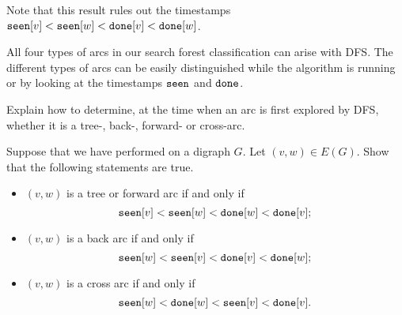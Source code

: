 Note that this result rules out  the timestamps $\seen[v] < \seen[w] < \done[v] < \done[w]$.



All four types of arcs in our search forest classification can
arise with DFS. The different types of arcs can be easily
distinguished while the algorithm is running or by looking at the timestamps 
$\seen$ and $\done$.

\begin{Boxample}[3]
Explain how to determine, at the time when an arc is first explored by
DFS, whether it is a tree-, back-, forward- or cross-arc.
\end{Boxample}

\begin{Boxample}[3]
Suppose that we have performed  on a digraph $G$. Let $(v, w)\in
E(G)$. Show that the following statements are true.
\begin{itemize}
\item
$(v, w)$ is a tree or forward arc if and only if  
$$\seen[v] < \seen[w] < \done[w] < \done[v];$$
\item
$(v, w)$ is a back arc if and only if
$$\seen[w] <  \seen[v] < \done[v] < \done[w];$$ 
\item
$(v, w)$ is a cross arc if and only if 
$$\seen[w] < \done[w]  < \seen[v] < \done[v].$$
\end{itemize}
\end{Boxample}




